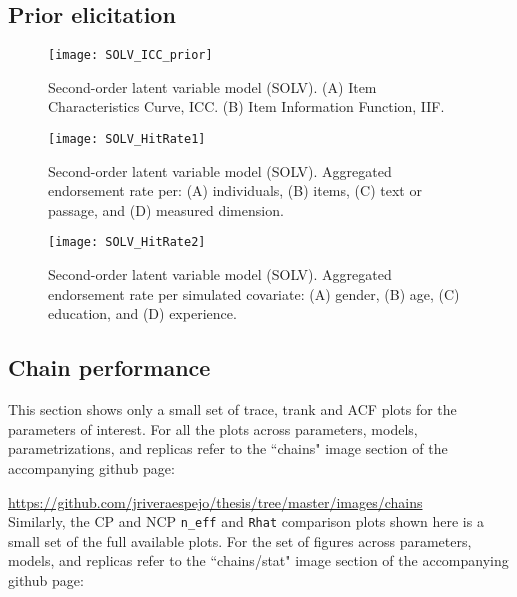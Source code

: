 \subsection{Prior elicitation}
%
\begin{figure}[H]
	\centering
	\texttt{[image: SOLV\_ICC\_prior]}
	\caption[Second-order latent variable model (SOLV). Item Characteristic Curve (ICC) and Item Information Function (IIF).]%
	{Second-order latent variable model (SOLV). (A) Item Characteristics Curve, ICC. (B) Item Information Function, IIF.}
	\label{fig:SOLV_ICC_prior}
\end{figure}
%
\begin{figure}[H]
	\centering
	\texttt{[image: SOLV\_HitRate1]}
	\caption[Second-order latent variable model (SOLV). Hit rate per dimensions of interest.]%
	{Second-order latent variable model (SOLV). Aggregated endorsement rate per: (A) individuals, (B) items, (C) text or passage, and (D) measured dimension.}
	\label{fig:SOLV_hitrate1}
\end{figure}
%
\begin{figure}[H]
	\centering
	\texttt{[image: SOLV\_HitRate2]}
	\caption[Second-order latent variable model (SOLV). Hit rate per simulated covariate.]%
	{Second-order latent variable model (SOLV). Aggregated endorsement rate per simulated covariate: (A) gender, (B) age, (C) education, and (D) experience.}
	\label{fig:SOLV_hitrate2}
\end{figure}


\subsection{Chain performance} \label{sub_sect:chain_performance}

This section shows only a small set of trace, trank and ACF plots for the parameters of interest. For all the plots across parameters, models, parametrizations, and replicas refer to the ``chains" image section of the accompanying github page:

\noindent \url{https://github.com/jriveraespejo/thesis/tree/master/images/chains} \\

Similarly, the CP and NCP \texttt{n\_eff} and \texttt{Rhat} comparison plots shown here is a small set of the full available plots. For the set of figures across parameters, models, and replicas refer to the ``chains/stat" image section of the accompanying github page:

